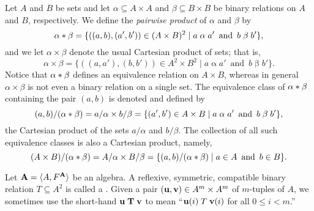 Let $A$ and $B$ be sets and let $\alpha \subseteq A\times A$ and $\beta \subseteq B\times B$
be binary relations on $A$ and $B$, respectively.
We define
the \emph{pairwise product} of $\alpha$ and $\beta$ by
\begin{equation}
\label{eq:pair-product}
\alpha \ast \beta = \{((a, b), (a', b')) 
\in (A\times B)^2 \mid a\mathrel{\alpha} a'\, \text{ and } \,  b\mathrel{\beta} b'\},
\end{equation}
and we let $\alpha \times \beta$ denote the usual Cartesian product of sets; that is,
\begin{equation}
\label{eq:set-product}
\alpha \times \beta = \{((a, a'), (b, b')) 
\in A^2\times B^2 \mid a\mathrel{\alpha} a' \, \text{ and } \, b\mathrel{\beta} b'\}.
\end{equation}
Notice that $\alpha \ast \beta$ defines an equivalence relation on
$A\times B$, whereas in general $\alpha\times \beta$ is 
not even a binary relation on a single set.
The equivalence class of $\alpha \ast \beta$ containing the pair
$(a, b)$ is denoted and defined by %
\[(a,b)/(\alpha \ast \beta) = a/\alpha \times b/\beta= 
    \{(a', b') \in A\times B \mid a\mathrel{\alpha} a' \, \text{ and } \,  b\mathrel{\beta} b'\},
    \]
the Cartesian product of the sets $a/\alpha$ and $b/\beta$.
The collection of all such equivalence classes is also a Cartesian product, namely,
\[
(A\times B)/(\alpha \ast \beta) =
A/\alpha \times B/\beta  = \{(a, b)/(\alpha \ast \beta) \mid a\in A \, \text{ and } \, b \in B\}.\]




Let $\mathbf{A} = \langle A, F^{\mathbf{A}}\rangle$ be an algebra.
A reflexive, symmetric, compatible binary relation $T\subseteq A^2$ is called a
.  
Given a pair $(\mathbf{u}, \mathbf{v}) \in A^m\times A^m$ of $m$-tuples of $A$, we sometimes
use the short-hand $\mathbf{u} \mathrel{\mathbf{T}} \mathbf{v}$ to mean
``$\mathbf{u}(i) \mathrel{T} \mathbf{v}(i)$ for all $0\leq i<m$.'' 

